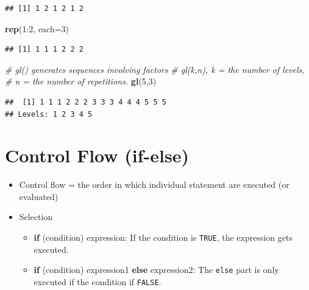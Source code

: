 \documentclass[]{book}
\newenvironment{Shaded}{\begin{snugshade}}{\end{snugshade}}
\newcommand{\KeywordTok}[1]{\textcolor[rgb]{0.13,0.29,0.53}{\textbf{{#1}}}}
\newcommand{\DataTypeTok}[1]{\textcolor[rgb]{0.13,0.29,0.53}{{#1}}}
\newcommand{\DecValTok}[1]{\textcolor[rgb]{0.00,0.00,0.81}{{#1}}}
\newcommand{\CommentTok}[1]{\textcolor[rgb]{0.56,0.35,0.01}{\textit{{#1}}}}
\newcommand{\NormalTok}[1]{{#1}}
\providecommand{\tightlist}{%
  \setlength{\itemsep}{0pt}\setlength{\parskip}{0pt}}
\begin{document}
\begin{verbatim}
## [1] 1 2 1 2 1 2
\end{verbatim}

\begin{Shaded}
\begin{Highlighting}[]
\KeywordTok{rep}\NormalTok{(}\DecValTok{1}\NormalTok{:}\DecValTok{2}\NormalTok{, }\DataTypeTok{each=}\DecValTok{3}\NormalTok{)}
\end{Highlighting}
\end{Shaded}

\begin{verbatim}
## [1] 1 1 1 2 2 2
\end{verbatim}

\begin{Shaded}
\begin{Highlighting}[]
\CommentTok{# gl() generates sequences involving factors}
\CommentTok{# gl(k,n), k = the number of levels, }
\CommentTok{# n = the number of repetitions.}
\KeywordTok{gl}\NormalTok{(}\DecValTok{5}\NormalTok{,}\DecValTok{3}\NormalTok{)}
\end{Highlighting}
\end{Shaded}

\begin{verbatim}
##  [1] 1 1 1 2 2 2 3 3 3 4 4 4 5 5 5
## Levels: 1 2 3 4 5
\end{verbatim}

\section{Control Flow (if-else)}\label{control-flow-if-else}

\begin{itemize}
\tightlist
\item
  Control flow = the order in which individual statement are executed
  (or evaluated)
\item
  Selection

  \begin{itemize}
  \tightlist
  \item
    \textbf{if} (condition) expression: If the condition is
    \texttt{TRUE}, the expression gets executed.
  \item
    \textbf{if} (condition) expression1 \textbf{else} expression2: The
    \texttt{else} part is only executed if the condition if
    \texttt{FALSE}.
  \end{itemize}
\end{itemize}
\end{document}
